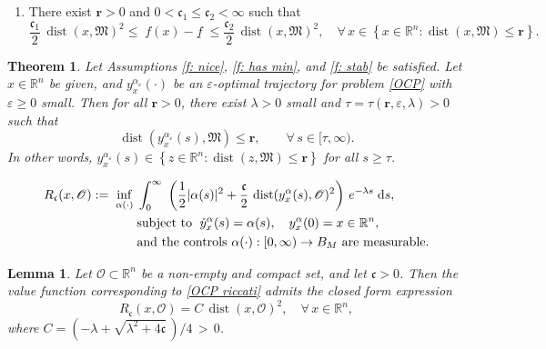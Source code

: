 \documentclass[10pt,a4paper]{amsart}
\newtheorem{theorem}{Theorem}
\newtheorem{lemma}{Lemma}
\newcommand{\D}[1]{\mbox{\rm #1}}
\newcommand{\dd}{\D{d}}
\begin{document}
\begin{enumerate}[label=\textbf{(D)}]
    \item\label{QG} There exist $\mathbf{r}>0$  and $0<\mathfrak{c}_{1}\leq \mathfrak{c}_{2}<\infty$  such that
    \begin{equation*}
    \frac{\mathfrak{c}_{1}}{2} \, \operatorname{dist}(x,\mathfrak M)^2 \leq \; f(x) - \underline{f} \; \leq  \frac{\mathfrak{c}_{2}}{2} \, \operatorname{dist}(x,\mathfrak M)^2, \quad\forall\,x \in \left\{x\in\mathbb{R}^{n}: \operatorname{dist}(x,\mathfrak{M})\leq \mathbf{r}\right\}.
    \end{equation*}
\end{enumerate}

\begin{theorem}\label{thm: practical}
Let Assumptions \ref{f: nice}, \ref{f: has min}, and \ref{f: stab} be satisfied. Let $x\in\mathbb{R}^{n}$ be given, and $y_{x}^{\alpha_{\varepsilon}}(\cdot)$ be an $\varepsilon$-optimal trajectory for problem \eqref{OCP} with $\varepsilon\geq 0$ small. 
Then for all $\mathbf{r}>0$, there exist $\lambda>0$ small and $\tau = \tau(\mathbf{r},\varepsilon, \lambda)>0$ such that 
\begin{equation*}
    \operatorname{dist}\left(y_{x}^{\alpha_{\varepsilon}}(s), \mathfrak{M}\right) \leq \mathbf{r}, \quad \quad \forall\, s\in [\tau, \infty).
\end{equation*}
In other words, $y_{x}^{\alpha_{\varepsilon}}(s) \in \left\{z\in \mathbb{R}^{n}: \operatorname{dist}(z,\mathfrak{M})\leq \mathbf{r}\right\}$ for all $s\geq \tau$. 
\end{theorem}

\begin{equation}\label{OCP riccati}
\begin{aligned}
    R_{\mathfrak{c}}(x,\mathscr{O}) := \; 
    \inf\limits_{\alpha(\cdot)} \; & \int_{0}^{\infty}\; \left(\frac{1}{2}|\alpha(s)|^{2} + \frac{\mathfrak{c}}{2}\,\operatorname{dist}(y_{x}^{\alpha}(s),\mathscr{O})^{2}\right)\, e^{-\lambda s}\;\dd s,\\
    & \text{subject  to  }\; \dot{y}_{x}^{\alpha}(s) = \alpha(s),\quad y_{x}^{\alpha}(0)=x\in\mathbb{R}^n,\\
    & \text{and the controls } \alpha(\cdot):[0,\infty) \to B_{M} \text{ are measurable}. 
\end{aligned}
\end{equation}

\begin{lemma}\label{lem: ricc}
Let $\mathscr{O}\subset\mathbb{R}^{n}$ be a non-empty and compact set, and let $\mathfrak{c}>0$. Then the value function corresponding to \eqref{OCP riccati} admits the closed form expression
\begin{equation*}
    R_{\mathfrak{c}}(x,\mathscr{O}) = C\,\operatorname{dist}(x,\mathscr{O})^{2} ,\quad \forall\,x\in\mathbb{R}^{n},
\end{equation*}
where $C = (-\lambda + \sqrt{\lambda^{2} + 4\mathfrak{c}}\,)/4 \,>\,0$.
\end{lemma}
\end{document}
